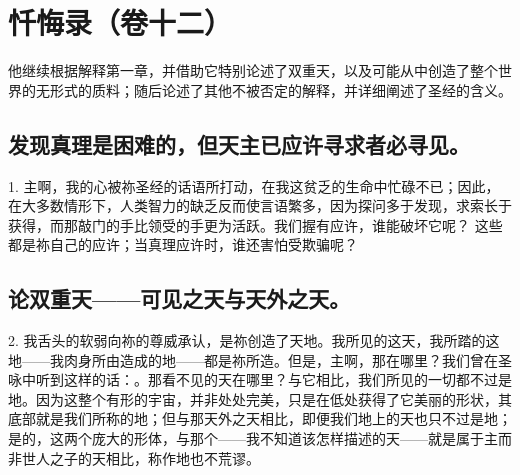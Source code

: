 
\section{忏悔录（卷十二）}

他继续根据解释第一章，并借助它特别论述了双重天，以及可能从中创造了整个世界的无形式的质料；随后论述了其他不被否定的解释，并详细阐述了圣经的含义。\par


\subsection{发现真理是困难的，但天主已应许寻求者必寻见。}

1. 主啊，我的心被祢圣经的话语所打动，在我这贫乏的生命中忙碌不已；因此，在大多数情形下，人类智力的缺乏反而使言语繁多，因为探问多于发现，求索长于获得，而那敲门的手比领受的手更为活跃。我们握有应许，谁能破坏它呢？     这些都是祢自己的应许；当真理应许时，谁还害怕受欺骗呢？\par


\subsection{论双重天——可见之天与天外之天。}

2. 我舌头的软弱向祢的尊威承认，是祢创造了天地。我所见的这天，我所踏的这地——我肉身所由造成的地——都是祢所造。但是，主啊，那在哪里？我们曾在圣咏中听到这样的话：。那看不见的天在哪里？与它相比，我们所见的一切都不过是地。因为这整个有形的宇宙，并非处处完美，只是在低处获得了它美丽的形状，其底部就是我们所称的地；但与那天外之天相比，即便我们地上的天也只不过是地；是的，这两个庞大的形体，与那个——我不知道该怎样描述的天——就是属于主而非世人之子的天相比，称作地也不荒谬。\par


